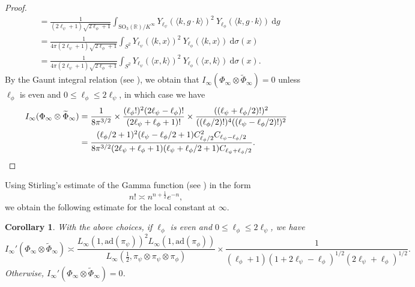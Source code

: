 \documentclass[11pt]{amsart}
\newtheorem{corollary}[theorem]{Corollary}
\theoremstyle{definition}
\begin{document}
\begin{proof}
\begin{align*}
    &= \frac{1}{(2\ell_{\psi}+1)\sqrt{2\ell_{\phi}+1}} \int_{\mathrm{SO}_3(\mathbb{R})/K^{\infty}} Y_{\ell_{\psi}}(\langle k, g\cdot k\rangle )^2 \: Y_{\ell_{\phi}}(\langle k, g\cdot k\rangle) \: \mathrm{d}g \\
    &= \frac{1}{4\pi (2\ell_{\psi}+1)\sqrt{2\ell_{\phi}+1}} \int_{S^2} Y_{\ell_{\psi}}(\langle k, x\rangle )^2 \: Y_{\ell_{\phi}}(\langle k, x\rangle) \: \mathrm{d}\sigma(x) \\
    &= \frac{1}{4\pi (2\ell_{\psi}+1)\sqrt{2\ell_{\phi}+1}} \int_{S^2} Y_{\ell_{\psi}}(\langle x, k\rangle)^2 \: Y_{\ell_{\phi}}(\langle x, k\rangle ) \: \mathrm{d}\sigma(x).
\end{align*}
By the Gaunt integral relation (see \cite[Appendix A]{CruzanProdsSpherHarms}), we obtain that $I_{\infty}(\Phi_{\infty} \otimes \widetilde{\Phi}_{\infty}) = 0$ unless $\ell_{\phi}$ is even and $0 \leq \ell_{\phi} \leq 2\ell_{\psi}$, in which case we have
\begin{align*}
    I_{\infty}(\Phi_{\infty}\otimes \widetilde{\Phi}_{\infty}) &= \frac{1}{8\pi^{3/2}} \times \frac{(\ell_{\phi}!)^2 (2\ell_{\psi}-\ell_{\phi})!}{(2\ell_{\psi} + \ell_{\phi}+1)!} \times \frac{((\ell_{\psi} + \ell_{\phi}/2)!)^2}{((\ell_{\phi}/2)!)^4 ((\ell_{\psi} - \ell_{\phi}/2)!)^2} \\
    &= \frac{(\ell_{\phi}/2+1)^2 (\ell_{\psi} - \ell_{\phi}/2 + 1)C_{\ell_{\phi}/2}^{2} C_{\ell_{\psi} - \ell_{\phi}/2}}{8\pi^{3/2} (2\ell_{\psi} + \ell_{\phi} + 1) (\ell_{\psi} + \ell_{\phi}/2 + 1) C_{\ell_{\psi} + \ell_{\phi}/2}}. \qedhere
\end{align*}
\end{proof}

Using Stirling's estimate of the Gamma function (see \cite[Thm.~C.1]{MontgomeryVaughan}) in the form $$n! \asymp n^{n+\frac{1}{2}} e^{-n},$$ we obtain the following estimate for the local constant at $\infty$.

\begin{corollary}\label{LocalConstInftyEstimate}
With the above choices, if $\ell_{\phi}$ is even and $0\leq \ell_{\phi} \leq 2\ell_{\psi}$, we have $$ I_{\infty}'(\Phi_{\infty} \otimes \widetilde{\Phi}_{\infty}) \asymp \frac{L_{\infty}(1,\mathrm{ad}(\pi_{\psi}))^2 L_{\infty}(1,\mathrm{ad}(\pi_{\phi}))}{L_{\infty}(\frac{1}{2},\pi_{\psi}\otimes \pi_{\psi} \otimes \pi_{\phi})} \times \frac{1}{(\ell_{\phi}+1) (1 + 2\ell_{\psi} - \ell_{\phi})^{1/2}(2\ell_{\psi} + \ell_{\phi})^{1/2}}.$$ Otherwise, $I_{\infty}'(\Phi_{\infty} \otimes \widetilde{\Phi}_{\infty}) = 0$.
\end{corollary}
\end{document}
